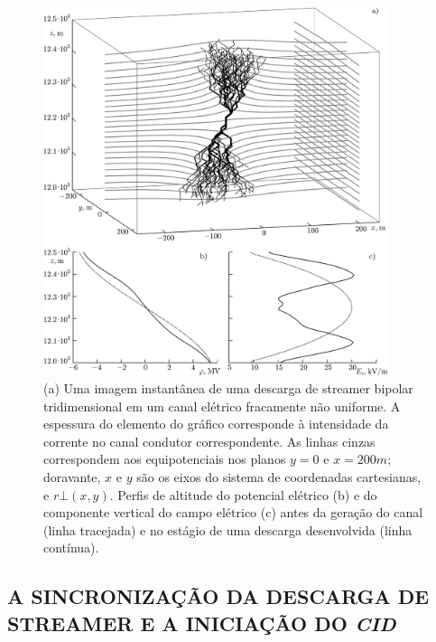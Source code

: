 \documentclass[a4paper, 12pt, onecolumn,singlespacing]{article}
\begin{document}
	\begin{figure}[!h]
		\centering
		\includegraphics[width=0.9\textwidth]{imagens/9.png}
		\caption{(a) Uma imagem instantânea de uma descarga de streamer bipolar tridimensional em um canal elétrico fracamente não uniforme. A espessura do elemento do gráfico corresponde à intensidade da corrente no canal condutor correspondente. As linhas cinzas correspondem aos equipotenciais nos planos $y = 0$ e $x = 200 m$; doravante, $x$ e $y$ são os eixos do sistema de coordenadas cartesianas, e $r \bot (x, y)$. Perfis de altitude do potencial elétrico (b) e do componente vertical do campo elétrico (c) antes da geração do canal (linha tracejada) e no estágio de uma descarga desenvolvida (linha contínua).}
		\label{fig:desenvolvimento_streamer}
	\end{figure}
	
	\subsection{A SINCRONIZAÇÃO DA DESCARGA DE STREAMER E A INICIAÇÃO DO \textit{CID}}
	
\end{document}
